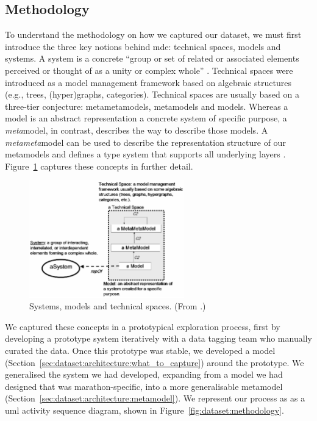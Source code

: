 \subsection{Methodology}
\label{sec:dataset:architecture:methodology}

To understand the methodology on how we captured our dataset, we must first introduce the three key notions behind \gls{mde}: technical spaces, models and systems. A system is a concrete ``group or set of related or associated elements perceived or thought of as a unity or complex whole'' \citep{oed:system}. Technical spaces were introduced \citet{Bezivin:2002} as a model management framework based on algebraic structures (e.g., trees, (hyper)graphs, categories). Technical spaces are usually based on a three-tier conjecture: metametamodels, metamodels and models. Whereas a model is an abstract representation a concrete system of specific purpose, a \textit{meta}model, in contrast, describes the way to describe those models. A \textit{metameta}model can be used to describe the representation structure of our metamodels and defines a type system that supports all underlying layers \citep{Bezivin:2006gw}. Figure~\ref{fig:dataset:bezivin2006_metamodel} captures these concepts in further detail.

\begin{figure}[h]
  \centering
  \includegraphics[width=0.6\textwidth]{images/dataset/bezivin2006_metamodel}
  \caption[An overview of systems, models and technical spaces]{Systems, models and technical spaces. (From \citep{Bezivin:2006gw}.)}
  \label{fig:dataset:bezivin2006_metamodel}
\end{figure}

We captured these concepts in a prototypical exploration process, first by developing a prototype system iteratively with a data tagging team who manually curated the data. Once this prototype was stable, we developed a model (Section~\ref{sec:dataset:architecture:what_to_capture}) around the prototype. We generalised the system we had developed, expanding from a model we had designed that was marathon-specific, into a more generalisable metamodel (Section~\ref{sec:dataset:architecture:metamodel}). We represent our process as as a \gls{uml} activity sequence diagram, shown in Figure~\ref{fig:dataset:methodology}.

